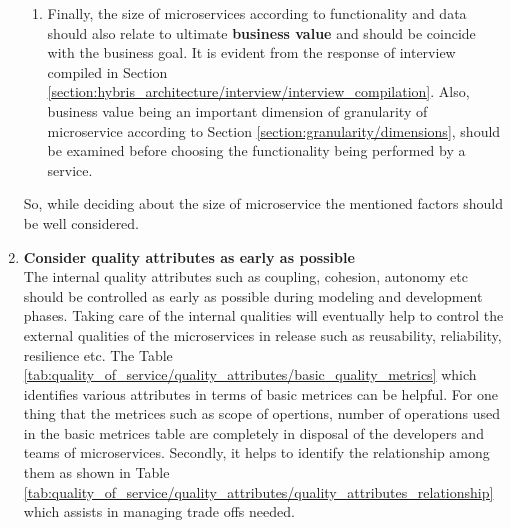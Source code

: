 \begin{enumerate}
\begin{enumerate}
\item Finally, the size of microservices according to functionality and data should also relate to ultimate \textbf{business value} and should be coincide with the business goal. It is evident from the response of interview compiled in Section \ref{section:hybris_architecture/interview/interview_compilation}. Also, business value being an important dimension of granularity of microservice according to Section \ref{section:granularity/dimensions}, should be examined before choosing the functionality being performed by a service.
\end{enumerate}
So, while deciding about the size of microservice the mentioned factors should be well considered.

\item \textbf{Consider quality attributes as early as possible} \\
The internal quality attributes such as coupling, cohesion, autonomy etc should be controlled as early as possible during modeling and development phases. Taking care of the internal qualities will eventually help to control the external qualities of the microservices in release such as reusability, reliability, resilience etc. The Table \ref{tab:quality_of_service/quality_attributes/basic_quality_metrics} which identifies various attributes in terms of basic metrices can be helpful. For one thing that the metrices such as scope of opertions, number of operations used in the basic metrices table are completely in disposal of the developers and teams of microservices. Secondly, it helps to identify the relationship among them as shown in Table \ref{tab:quality_of_service/quality_attributes/quality_attributes_relationship} which assists in managing trade offs needed.


\end{enumerate}
